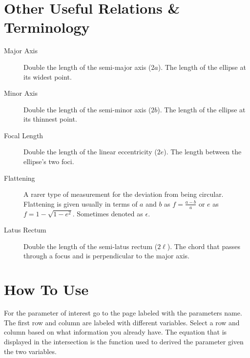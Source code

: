 \documentclass{article}
\begin{document}
\section*{Other Useful Relations \& Terminology}
\begin{description}
\item[Major Axis] Double the length of the semi-major axis ($2a$). The length of the ellipse at its widest point.
\item[Minor Axis] Double the length of the semi-minor axis ($2b$). The length of the ellipse at its thinnest point.
\item[Focal Length] Double the length of the linear eccentricity ($2e$). The length between the ellipse's two foci.
\item[Flattening] A rarer type of measurement for the deviation from being circular. Flattening is given usually in terms of $a$ and $b$ as $f=\frac{a-b}{a}$ or $e$ as $f=1-\sqrt{1-e^2}$. Sometimes denoted as $\epsilon$.
\item[Latus Rectum] Double the length of the semi-latus rectum ($2\ell$). The chord that passes through a focus and is perpendicular to the major axis.
\end{description}

\section*{How To Use}
For the parameter of interest go to the page labeled with the parameters name. 
The first row and column are labeled with different variables. 
Select a row and column based on what information you already have. 
The equation that is displayed in the intersection is the function used to derived the parameter given the two variables. 
\end{document}
